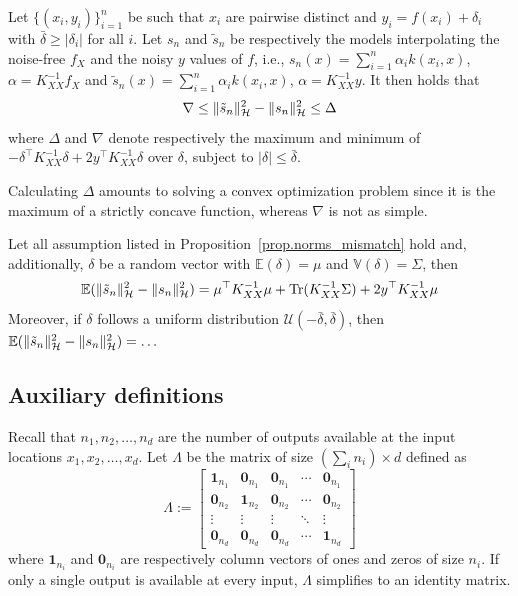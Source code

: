 \begin{proposition}
	Let $\{(x_i,y_i)\}_{i=1}^n$ be such that $x_i$ are pairwise distinct and $y_i = f(x_i) + \delta_i$ with $\bar \delta \geq |\delta_i|$ for all $i$. Let $s_n$ and $\tilde s_n$ be respectively the models interpolating the noise-free $f_X$ and the noisy $y$ values of $f$, i.e., $s_n(x) = \sum_{i=1}^n \alpha_i k(x_i,x)$, $\alpha = K_{XX}^{-1} f_X$ and $\tilde s_n(x) = \sum_{i=1}^n \alpha_i k(x_i,x)$, $\alpha = K_{XX}^{-1} y$. It then holds that
	\begin{equation}
		\nabla \leq \Vert \tilde s_n \Vert_{\mathcal{H}}^2 - \Vert s_n \Vert_{\mathcal{H}}^2 \leq \Delta
	\end{equation}
	where $\Delta$ and $\nabla$ denote respectively the maximum and minimum of $-\delta^\top K_{XX}^{-1} \delta + 2y^\top K_{XX}^{-1} \delta$ over $\delta$, subject to $|\delta| \leq \bar \delta$.
	\label{prop.norms_mismatch}
\end{proposition}

Calculating $\Delta$ amounts to solving a convex optimization problem since it is the maximum of a strictly concave function, whereas $\nabla$ is not as simple.

\begin{proposition}
	Let all assumption listed in Proposition~\ref{prop.norms_mismatch} hold and, additionally, $\delta$ be a random vector with $\mathbb{E}(\delta) = \mu$ and $\mathbb{V}(\delta) = \Sigma$, then
	\begin{equation}
		\mathbb{E}(\Vert \tilde s_n \Vert_{\mathcal{H}}^2 - \Vert s_n \Vert_{\mathcal{H}}^2) = \mu^\top K_{XX}^{-1} \mu + \text{Tr}(K_{XX}^{-1}\Sigma) + 2y^\top K_{XX}^{-1} \mu
	\end{equation}
	Moreover, if $\delta$ follows a uniform distribution $\mathcal{U}(-\bar \delta, \bar \delta)$, then $\mathbb{E}(\Vert \tilde s_n \Vert_{\mathcal{H}}^2 - \Vert s_n \Vert_{\mathcal{H}}^2) = \dots$
	\label{prop.expected}
\end{proposition}

\subsection{Auxiliary definitions}
\label{sec.auxiliary_definitions}

Recall that $n_1, n_2, \dots, n_d$ are the number of outputs available at the input locations $x_1,x_2,\dots,x_d$. Let $\Lambda$ be the matrix of size $(\sum_i n_i) \times d$ defined as
\begin{equation}
	\Lambda :=
	\begin{bmatrix}
		\bm{1}_{n_1} & \bm{0}_{n_1} & \bm{0}_{n_1} & \cdots & \bm{0}_{n_1} \\
		\bm{0}_{n_2} & \bm{1}_{n_2} & \bm{0}_{n_2} & \cdots & \bm{0}_{n_2} \\
		\vdots & \vdots & \vdots & \ddots & \vdots \\ 
		\bm{0}_{n_d} & \bm{0}_{n_d} & \bm{0}_{n_d} & \cdots & \bm{1}_{n_d} 
	\end{bmatrix}
\end{equation}
where $\bm{1}_{n_i}$ and $\bm{0}_{n_i}$ are respectively column vectors of ones and zeros of size $n_i$. If only a single output is available at every input, $\Lambda$ simplifies to an identity matrix.

